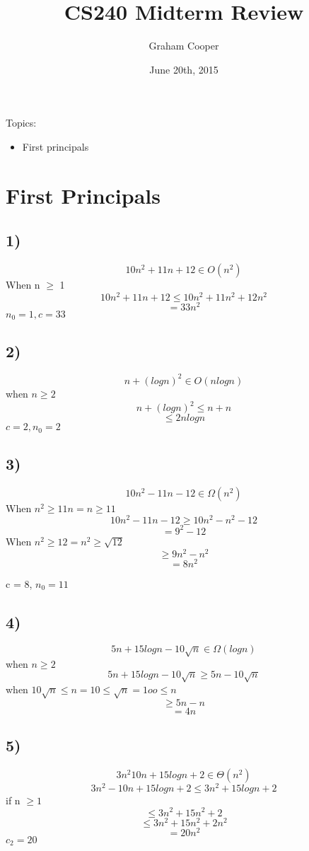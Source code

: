 \documentclass[12pt]{article}
\title{\vspace{-15ex}CS240 Midterm Review\vspace{-1ex}}
\date{June 20th, 2015}
\author{Graham Cooper}
\begin{document}
	\maketitle
	
	Topics:\\
	\begin{itemize}
		\item First principals
	\end{itemize}
	
	\section*{First Principals}
	\subsection*{1)}
	$$10n^2 + 11n + 12 \in O(n^2)$$
	When n $\geq$ 1\\
	$$10n^2 + 11n + 12 \leq 10n^2 + 11n^2 + 12n^2$$
	$$= 33n^2$$
	$n_0 = 1, c = 33$\\
	
	\subsection*{2)}
	$$n+ (logn)^2 \in O(nlogn)$$
	when $n \geq 2$\\
	$$n + (logn)^2 \leq n + n$$
	$$\leq 2nlogn$$
	$c = 2, n_0 = 2$
	
	\subsection*{3)}
	$$10n^2 - 11n - 12 \in \Omega(n^2)$$
	When $n^2 \geq 11n = n \geq 11$\\
	$$10n^2 - 11n - 12 \geq 10n^2 - n^2 - 12$$
	$$= 9^2 - 12$$
	When $n^2 \geq 12 = n^2 \geq \sqrt{12}$
	$$\geq 9n^2 - n^2$$
	$$= 8n^2$$
	
	c = 8, $n_0 = 11$\\
	
	\subsection*{4)}
	$$5n + 15logn - 10\sqrt{n} \in \Omega(logn)$$
	when $n \geq 2$\\
	$$5n + 15logn - 10\sqrt{n} \geq 5n - 10\sqrt{n}$$
	when $10\sqrt{n} \leq n = 10 \leq \sqrt{n} = 1oo \leq n$\\
	$$\geq 5n - n$$
	$$= 4n$$
	
	\subsection*{5)}
	$$3n^2 10n + 15logn + 2 \in \Theta(n^2)$$
	$$3n^2 - 10n + 15logn + 2 \leq 3n^2 + 15logn + 2$$
	if n $\geq 1$\\
	$$\leq 3n^2 + 15n^2 + 2$$
	$$\leq 3n^2 + 15n^2 + 2n^2$$
	$$= 20n^2$$
	$c_2 = 20$\\
	
\end{document}
